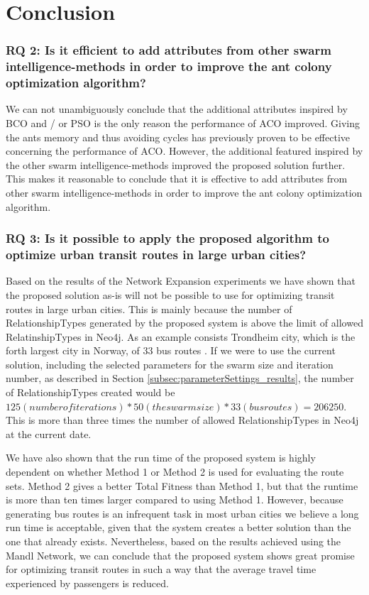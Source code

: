 \section{Conclusion}

\subsubsection*{RQ 2: Is it efficient to add attributes from other swarm intelligence-methods in order to improve the ant colony optimization algorithm?}

We can not unambiguously conclude that the additional attributes inspired by BCO and / or PSO is the only reason the performance of ACO improved. Giving the ants memory and thus avoiding cycles has previously proven to be effective concerning the performance of ACO\citep{dorigo96, sedighpour14, poorzahedy11, salehinejad10}.  However, the additional featured inspired by the other swarm intelligence-methods improved the proposed solution further. This makes it reasonable to conclude that it is effective to add attributes from other swarm intelligence-methods in order to improve the ant colony optimization algorithm.

\subsubsection*{RQ 3: Is it possible to apply the proposed algorithm to optimize urban transit routes in large urban cities?}

Based on the results of the Network Expansion experiments we have shown that the proposed solution as-is will not be possible to use for optimizing transit routes in large urban cities. This is mainly because the number of RelationshipTypes generated by the proposed system is above the limit of allowed RelatinshipTypes in Neo4j. As an example consists Trondheim city, which is the forth largest city in Norway, of 33 bus routes \citep{website:atb-linjenett}. If we were to use the current solution, including the selected parameters for the swarm size and iteration number, as described in Section \vref{subsec:parameterSettings_results}, the number of RelationshipTypes created would be $125 (number of iterations) * 50 (the swarm size) * 33 (bus routes) = 206 250$. This is more than three times the number of allowed RelationshipTypes in Neo4j at the current date. 

We have also shown that the run time of the proposed system is highly dependent on whether Method 1 or Method 2 is used for evaluating the route sets. Method 2 gives a better Total Fitness than Method 1, but that the runtime is more than ten times larger compared to using Method 1. However, because generating bus routes is an infrequent task in most urban cities we believe a long run time is acceptable, given that the system creates a better solution than the one that already exists. Nevertheless, based on the results achieved using the Mandl Network, we can conclude that the proposed system shows great promise for optimizing transit routes in such a way that the average travel time experienced by passengers is reduced. 




